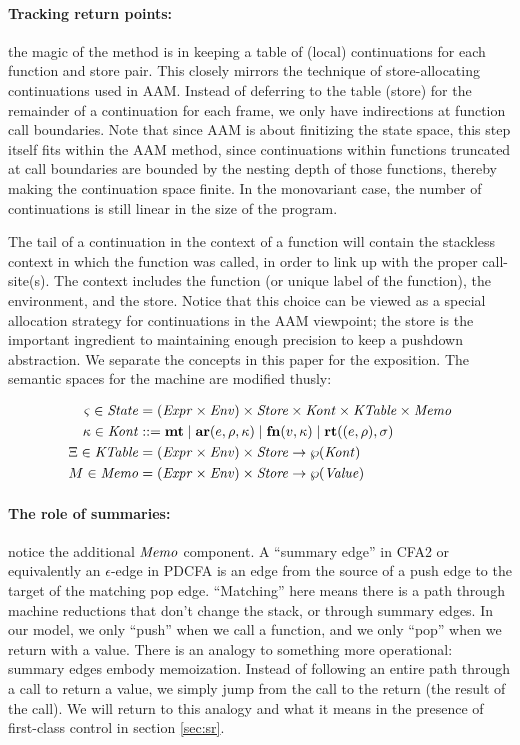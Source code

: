 \documentclass{llncs}
\begin{document}
\paragraph{Tracking return points:} the magic of the method is in
keeping a table of (local) continuations for each function and store
pair. This closely mirrors the technique of store-allocating
continuations used in AAM. Instead of deferring to the table (store)
for the remainder of a continuation for each frame, we only have
indirections at function call boundaries. Note that since AAM is about
finitizing the state space, this step itself fits within the AAM
method, since continuations within functions truncated at call
boundaries are bounded by the nesting depth of those functions,
thereby making the continuation space finite. In the monovariant case,
the number of continuations is still linear in the size of the
program.

The tail of a continuation in the context of a function will contain
the stackless context in which the function was called, in order to
link up with the proper call-site(s). The context includes the
function (or unique label of the function), the environment, and the
store. Notice that this choice can be viewed as a special allocation
strategy for continuations in the AAM viewpoint; the store is the
important ingredient to maintaining enough precision to keep a
pushdown abstraction. We separate the concepts in this paper for the
exposition. The semantic spaces for the machine are modified thusly:

\begin{align*}
  \varsigma \in \mathit{State} &= (\mathit{Expr} \times \mathit{Env}) \times \mathit{Store} \times \mathit{Kont} \times \mathit{KTable} \times \mathit{Memo} \\
  \kappa \in \mathit{Kont} &::= \mathbf{mt}
                     \mid \mathbf{ar}{}(e,\rho,\kappa) 
                     \mid \mathbf{fn}{}(v,\kappa)
                     \mid \mathbf{rt}((e,\rho),\sigma)\\
  \Xi \in \mathit{KTable} &= (\mathit{Expr} \times \mathit{Env})\times \mathit{Store} \to \wp(\mathit{Kont}) \\
  M \in \mathit{Memo} &= (\mathit{Expr} \times \mathit{Env})\times \mathit{Store} \to \wp(\mathit{Value})
\end{align*}

\paragraph{The role of summaries:} notice the additional $\mathit{Memo}$
component. A ``summary edge'' in CFA2 or equivalently an
$\epsilon$-edge in PDCFA is an edge from the source of a push edge to
the target of the matching pop edge. ``Matching'' here means there is
a path through machine reductions that don't change the stack, or
through summary edges. In our model, we only ``push'' when we call a
function, and we only ``pop'' when we return with a value. There is an
analogy to something more operational: summary edges embody
memoization. Instead of following an entire path through a call to
return a value, we simply jump from the call to the return (the result
of the call). We will return to this analogy and what it
means in the presence of first-class control in section \ref{sec:sr}.
\end{document}
